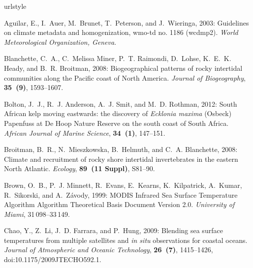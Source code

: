 \documentclass[]{ametsoc}
\begin{document}
\begin{thebibliography}{41}
\providecommand{\natexlab}[1]{#1}
\providecommand{\url}[1]{\texttt{#1}}
\renewcommand{\UrlFont}{\rmfamily}
\providecommand{\urlprefix}{URL }
\expandafter\ifx\csname urlstyle\endcsname\relax
  \providecommand{\doi}[1]{doi:\discretionary{}{}{}#1}\else
  \providecommand{\doi}{doi:\discretionary{}{}{}\begingroup
  \urlstyle{rm}\Url}\fi
\providecommand{\eprint}[2][]{\url{#2}}

Aguilar, E., I.~Auer, M.~Brunet, T.~Peterson, and J.~Wieringa, 2003: Guidelines
  on climate metadata and homogenization, wmo-td no. 1186 (wcdmp2).
  \textit{World Meteorological Organization, Geneva}.

Blanchette, C.~A., C.~{Melissa Miner}, P.~T. Raimondi, D.~Lohse, K.~E.~K.
  Heady, and B.~R. Broitman, 2008: {Biogeographical patterns of rocky
  intertidal communities along the Pacific coast of North America}.
  \textit{Journal of Biogeography}, \textbf{35~(9)}, 1593--1607.

Bolton, J.~J., R.~J. Anderson, A.~J. Smit, and M.~D. Rothman, 2012: {South
  African kelp moving eastwards: the discovery of \textit{Ecklonia maxima} (Osbeck)
  Papenfuss at De Hoop Nature Reserve on the south coast of South Africa}.
  \textit{African Journal of Marine Science}, \textbf{34~(1)}, 147--151.

Broitman, B.~R., N.~Mieszkowska, B.~Helmuth, and C.~A. Blanchette, 2008:
  {Climate and recruitment of rocky shore intertidal invertebrates in the
  eastern North Atlantic.} \textit{Ecology}, \textbf{89~(11 Suppl)}, S81--90.

Brown, O.~B., P.~J. Minnett, R.~Evans, E.~Kearns, K.~Kilpatrick, A.~Kumar,
  R.~Sikorski, and A.~Z{\'{a}}vody, 1999: {MODIS Infrared Sea Surface
  Temperature Algorithm Algorithm Theoretical Basis Document Version 2.0}.
  \textit{University of Miami}, 31\,098--33\,149.

Chao, Y., Z.~Li, J.~D. Farrara, and P.~Hung, 2009: {Blending sea surface
  temperatures from multiple satellites and \textit{in situ} observations for coastal
  oceans}. \textit{Journal of Atmospheric and Oceanic Technology},
  \textbf{26~(7)}, 1415--1426, \doi{10.1175/2009JTECHO592.1}.


\end{thebibliography}
\end{document}
